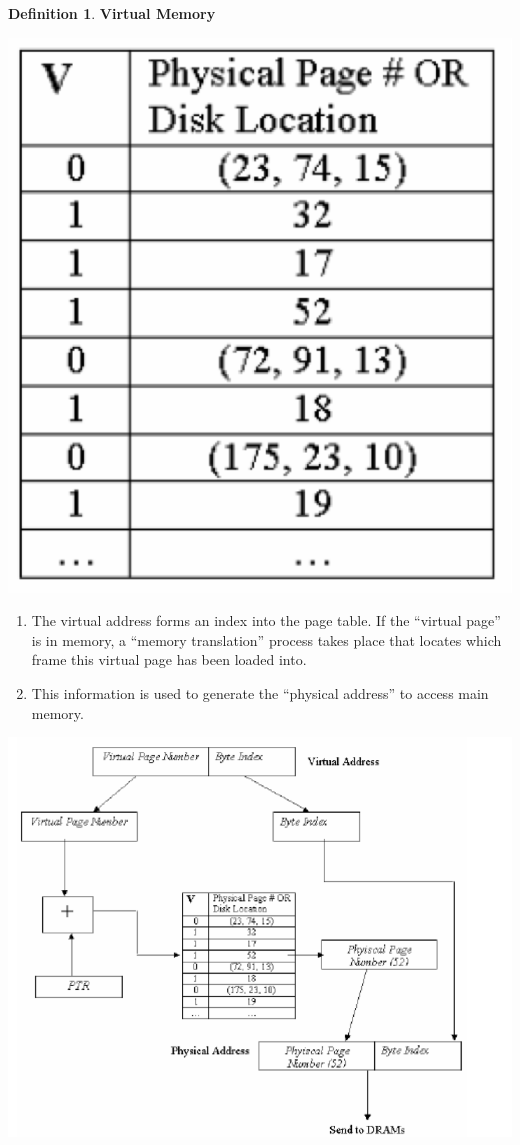 \documentclass[11pt,a4paper]{article}
\theoremstyle{definition}
\newtheorem{definition}{Definition}[section]
\newenvironment{myenumerate}
{ \begin{enumerate}
    \setlength{\itemsep}{5pt}
    \setlength{\parskip}{0pt}
    \setlength{\parsep}{0pt}     }
{ \end{enumerate}                }
\begin{document}
\begin{definition}{\textbf{Virtual Memory}}
\begin{minipage}{0.75\linewidth}
\end{minipage}
\begin{minipage}{0.25\linewidth}
	\includegraphics[width=.9\linewidth]{m5/pagetable}
\end{minipage}

\begin{minipage}{0.5\linewidth}
	\begin{myenumerate}
		\item The virtual address forms an index into the page table. If the ``virtual page'' is in memory, a ``memory translation'' process takes place that locates which frame this virtual page has been loaded into.
		\item This information is used to generate the ``physical address'' to access main memory.
	\end{myenumerate}
\end{minipage}
\begin{minipage}{0.5\linewidth}
	\includegraphics[width=.8\linewidth]{m5/translationProcedure}
\end{minipage}


\end{definition}
\end{document}
